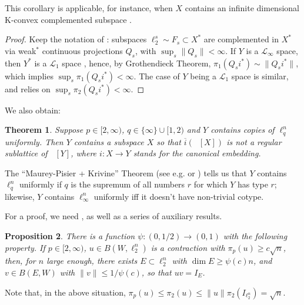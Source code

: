 \documentclass{amsart}
\theoremstyle{plain}
\newtheorem{theorem}{Theorem}[section]
\newtheorem{proposition}[theorem]{Proposition}
\theoremstyle{definition}
\numberwithin{equation}{section}
\DeclareMathOperator{\FBLp}{FBL^{\mathit{(p)}}}
\begin{document}
This corollary is applicable, for instance, when $X$ contains an infinite dimensional K-convex complemented subspace \cite[Theorem 19.3]{DJT}.

\begin{proof}
Keep the notation of : subspaces $\ell_2^s \sim F_s \subset X^*$ are complemented in $X^*$ via weak$^*$ continuous projections $Q_s$, with $\sup_s \|Q_s\| < \infty$.
If $Y$ is a $\mathcal L_\infty$ space, then $Y^*$ is a $\mathcal L_1$ space \cite{LiRo}, hence, by Grothendieck Theorem, $\pi_1(Q_s i^*) \sim \|Q_s i^*\|$, which implies $\sup_s \pi_1(Q_s i^*) < \infty$.
The case of $Y$ being a $\mathcal L_1$ space is similar, and relies on $\sup_s \pi_2(Q_s i^*) < \infty$.
\end{proof}

We also obtain:

\begin{theorem}\label{l q uniformly}
Suppose $p \in [2,\infty)$, $q \in \{\infty\} \cup [1,2)$ and $Y$ contains copies of $\ell_q^n$ uniformly. Then $Y$ contains a subspace $X$ so that $\overline{i}(\FBLp[X])$ is not a regular sublattice of $\FBLp[Y]$, where $i : X \to Y$ stands for the canonical embedding. 
\end{theorem}

The ``Maurey-Pisier + Krivine'' Theorem (see e.g. \cite[Theorem 6]{Maurey} or \cite[Theorem 13.2]{MS}) tells us that $Y$ contains $\ell_q^n$ uniformly if $q$ is the supremum of all numbers $r$ for which $Y$ has type $r$; likewise, $Y$ contains $\ell_\infty^n$ uniformly iff it doesn't have non-trivial cotype.

For a proof, we need , as well as a series of auxiliary results.

\begin{proposition}\label{liftings}
There is a function $\psi : (0,1/2) \to (0,1)$ %
with the following property.
If $p \in [2,\infty)$, $u \in B(W,\ell_2^n)$ is a contraction with $\pi_p(u) \geq c \sqrt{n}$, then, for $n$ large enough, there exists $E \subset \ell_2^n$ with $\dim E \geq \psi(c) n$, and $v \in B(E,W)$ with $\|v\| \leq 1/\psi(c)$, so that $uv = I_E$.
\end{proposition}

Note that, in the above situation, $\pi_p(u) \leq \pi_2(u) \leq \|u\| \pi_2(I_{\ell_2^n}) = \sqrt{n}$.
\end{document}
